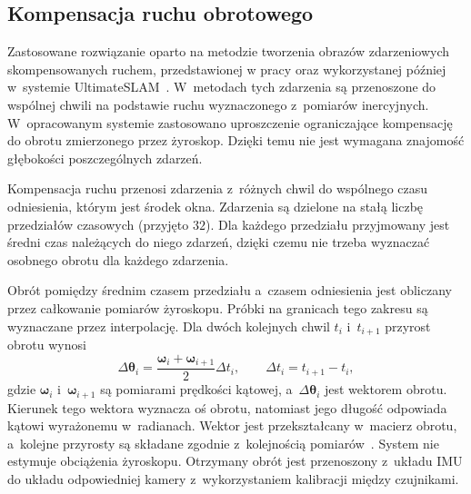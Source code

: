 \subsection{Kompensacja ruchu obrotowego}
\label{subsec:kompensacja_ruchu}
Zastosowane rozwiązanie oparto na metodzie tworzenia obrazów zdarzeniowych skompensowanych ruchem, przedstawionej w pracy \cite{rebecq2017eventvio} oraz wykorzystanej później w~systemie UltimateSLAM~\cite{vidal2018ultimate}. W~metodach tych zdarzenia są przenoszone do wspólnej chwili na podstawie ruchu wyznaczonego z~pomiarów inercyjnych. W~opracowanym systemie zastosowano uproszczenie ograniczające kompensację do obrotu zmierzonego przez żyroskop. Dzięki temu nie jest wymagana znajomość głębokości poszczególnych zdarzeń.

Kompensacja ruchu przenosi zdarzenia z~różnych chwil do wspólnego czasu odniesienia, którym jest środek okna. Zdarzenia są dzielone na stałą liczbę przedziałów czasowych (przyjęto $32$). Dla każdego przedziału przyjmowany jest średni czas należących do niego zdarzeń, dzięki czemu nie trzeba wyznaczać osobnego obrotu dla każdego zdarzenia.

Obrót pomiędzy średnim czasem przedziału a~czasem odniesienia jest obliczany przez całkowanie pomiarów żyroskopu. Próbki na granicach tego zakresu są wyznaczane przez interpolację. Dla dwóch kolejnych chwil $t_i$ i~$t_{i+1}$ przyrost obrotu wynosi
\begin{equation}
    \Delta\boldsymbol{\theta}_i=
    \frac{\boldsymbol{\omega}_i+\boldsymbol{\omega}_{i+1}}{2}\Delta t_i,
    \qquad
    \Delta t_i=t_{i+1}-t_i,
    \label{eq:implementation_gyro_integration}
\end{equation}
gdzie $\boldsymbol{\omega}_i$ i~$\boldsymbol{\omega}_{i+1}$ są pomiarami prędkości kątowej, a~$\Delta\boldsymbol{\theta}_i$ jest wektorem obrotu. Kierunek tego wektora wyznacza oś obrotu, natomiast jego długość odpowiada kątowi wyrażonemu w~radianach. Wektor jest przekształcany w~macierz obrotu, a~kolejne przyrosty są składane zgodnie z~kolejnością pomiarów~\cite{forster2015preintegration}. System nie estymuje obciążenia żyroskopu. Otrzymany obrót jest przenoszony z~układu IMU do układu odpowiedniej kamery z~wykorzystaniem kalibracji między czujnikami.

